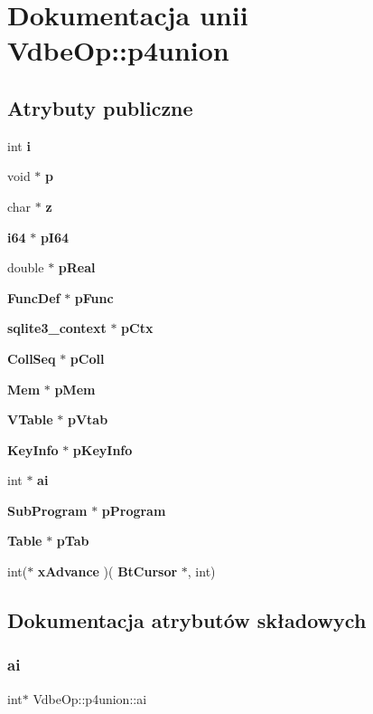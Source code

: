 \section{Dokumentacja unii Vdbe\+Op\+::p4union}
\label{union_vdbe_op_1_1p4union}
\subsection*{Atrybuty publiczne}
\begin{DoxyCompactItemize}
\item 
int \textbf{ i}
\item 
void $\ast$ \textbf{ p}
\item 
char $\ast$ \textbf{ z}
\item 
\textbf{ i64} $\ast$ \textbf{ p\+I64}
\item 
double $\ast$ \textbf{ p\+Real}
\item 
\textbf{ Func\+Def} $\ast$ \textbf{ p\+Func}
\item 
\textbf{ sqlite3\+\_\+context} $\ast$ \textbf{ p\+Ctx}
\item 
\textbf{ Coll\+Seq} $\ast$ \textbf{ p\+Coll}
\item 
\textbf{ Mem} $\ast$ \textbf{ p\+Mem}
\item 
\textbf{ V\+Table} $\ast$ \textbf{ p\+Vtab}
\item 
\textbf{ Key\+Info} $\ast$ \textbf{ p\+Key\+Info}
\item 
int $\ast$ \textbf{ ai}
\item 
\textbf{ Sub\+Program} $\ast$ \textbf{ p\+Program}
\item 
\textbf{ Table} $\ast$ \textbf{ p\+Tab}
\item 
int($\ast$ \textbf{ x\+Advance} )(\textbf{ Bt\+Cursor} $\ast$, int)
\end{DoxyCompactItemize}


\subsection{Dokumentacja atrybutów składowych}
\mbox{\label{union_vdbe_op_1_1p4union_a1bd30fbce8b173d7270d04dc714863f3}} 
\subsubsection{ai}
{\footnotesize\ttfamily int$\ast$ Vdbe\+Op\+::p4union\+::ai}


